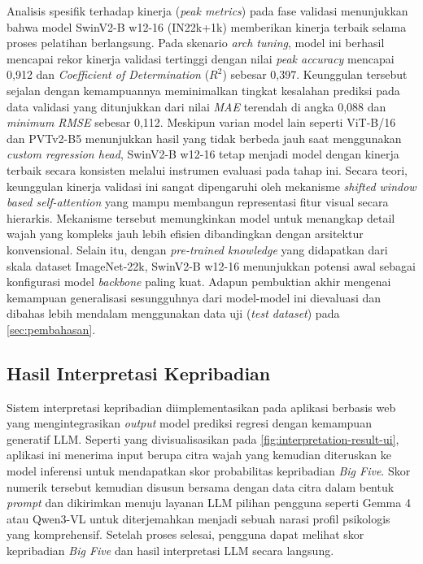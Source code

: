 Analisis spesifik terhadap kinerja (\textit{peak metrics}) pada fase validasi menunjukkan bahwa model SwinV2-B w12-16 (IN22k+1k) memberikan kinerja terbaik selama proses pelatihan berlangsung. Pada skenario \textit{arch tuning}, model ini berhasil mencapai rekor kinerja validasi tertinggi dengan nilai \textit{peak accuracy} mencapai 0,912 dan \textit{Coefficient of Determination} ($R^2$) sebesar 0,397. Keunggulan tersebut sejalan dengan kemampuannya meminimalkan tingkat kesalahan prediksi pada data validasi yang ditunjukkan dari nilai \textit{MAE} terendah di angka 0,088 dan \textit{minimum RMSE} sebesar 0,112. Meskipun varian model lain seperti ViT-B/16 dan PVTv2-B5 menunjukkan hasil yang tidak berbeda jauh saat menggunakan \textit{custom regression head}, SwinV2-B w12-16 tetap menjadi model dengan kinerja terbaik secara konsisten melalui instrumen evaluasi pada tahap ini. Secara teori, keunggulan kinerja validasi ini sangat dipengaruhi oleh mekanisme \textit{shifted window based self-attention} yang mampu membangun representasi fitur visual secara hierarkis. Mekanisme tersebut memungkinkan model untuk menangkap detail wajah yang kompleks jauh lebih efisien dibandingkan dengan arsitektur konvensional. Selain itu, dengan \textit{pre-trained knowledge} yang didapatkan dari skala dataset ImageNet-22k, SwinV2-B w12-16 menunjukkan potensi awal sebagai konfigurasi model \textit{backbone} paling kuat. Adapun pembuktian akhir mengenai kemampuan generalisasi sesungguhnya dari model-model ini dievaluasi dan dibahas lebih mendalam menggunakan data uji (\textit{test dataset}) pada \autoref{sec:pembahasan}.

\subsection{Hasil Interpretasi Kepribadian}

Sistem interpretasi kepribadian diimplementasikan pada aplikasi berbasis web yang mengintegrasikan \textit{output} model prediksi regresi dengan kemampuan generatif LLM. Seperti yang divisualisasikan pada \autoref{fig:interpretation-result-ui}, aplikasi ini menerima input berupa citra wajah yang kemudian diteruskan ke model inferensi untuk mendapatkan skor probabilitas kepribadian \textit{Big Five}. Skor numerik tersebut kemudian disusun bersama dengan data citra dalam bentuk \textit{prompt} dan dikirimkan menuju layanan LLM pilihan pengguna seperti Gemma 4 atau Qwen3-VL untuk diterjemahkan menjadi sebuah narasi profil psikologis yang komprehensif. Setelah proses selesai, pengguna dapat melihat skor kepribadian \textit{Big Five} dan hasil interpretasi LLM secara langsung.

